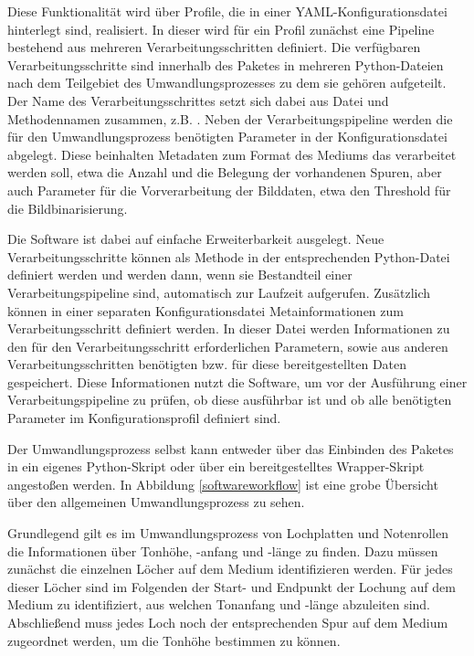 Diese Funktionalität wird über Profile, die in einer YAML-Konfigurationsdatei hinterlegt sind, realisiert.
In dieser wird für ein Profil zunächst eine Pipeline bestehend aus mehreren Verarbeitungsschritten definiert.
Die verfügbaren Verarbeitungsschritte sind innerhalb des Paketes in mehreren Python-Dateien nach dem Teilgebiet des Umwandlungsprozesses zu dem sie gehören aufgeteilt.
Der Name des Verarbeitungsschrittes setzt sich dabei aus Datei und Methodennamen zusammen, z.B. .
Neben der Verarbeitungspipeline werden die für den Umwandlungsprozess benötigten Parameter in der Konfigurationsdatei abgelegt.
Diese beinhalten Metadaten zum Format des Mediums das verarbeitet werden soll, etwa die Anzahl und die Belegung der vorhandenen Spuren, aber auch Parameter für die Vorverarbeitung der Bilddaten, etwa den Threshold für die Bildbinarisierung.

Die Software ist dabei auf einfache Erweiterbarkeit ausgelegt.
Neue Verarbeitungsschritte können als Methode in der entsprechenden Python-Datei definiert werden und werden dann, wenn sie Bestandteil einer Verarbeitungspipeline sind, automatisch zur Laufzeit aufgerufen.
Zusätzlich können in einer separaten Konfigurationsdatei Metainformationen zum Verarbeitungsschritt definiert werden.
In dieser Datei werden Informationen zu den für den Verarbeitungsschritt erforderlichen Parametern, sowie aus anderen Verarbeitungsschritten benötigten bzw. für diese bereitgestellten Daten gespeichert.
Diese Informationen nutzt die Software, um vor der Ausführung einer Verarbeitungspipeline zu prüfen, ob diese ausführbar ist und ob alle benötigten Parameter im Konfigurationsprofil definiert sind.

Der Umwandlungsprozess selbst kann entweder über das Einbinden des Paketes in ein eigenes Python-Skript oder über ein bereitgestelltes Wrapper-Skript angestoßen werden.
In Abbildung \ref*{softwareworkflow} ist eine grobe Übersicht über den allgemeinen Umwandlungsprozess zu sehen.

Grundlegend gilt es im Umwandlungsprozess von Lochplatten und Notenrollen die Informationen über Tonhöhe, -anfang und -länge zu finden.
Dazu müssen zunächst die einzelnen Löcher auf dem Medium identifizieren werden.
Für jedes dieser Löcher sind im Folgenden der Start- und Endpunkt der Lochung auf dem Medium zu identifiziert, aus welchen Tonanfang und -länge abzuleiten sind.
Abschließend muss jedes Loch noch der entsprechenden Spur auf dem Medium zugeordnet werden, um die Tonhöhe bestimmen zu können.

